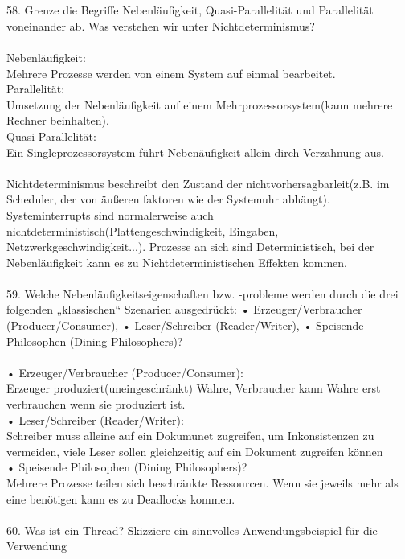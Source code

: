 \documentclass{article}
\newcommand\tab[1][1cm]{\hspace*{#1}}
\begin{document}
\\
\\
58. Grenze die Begriffe Nebenläufigkeit, Quasi-Parallelität und Parallelität voneinander ab.
Was verstehen wir unter Nichtdeterminismus?
\\
\\
Nebenl\"aufigkeit:\\
\tab Mehrere Prozesse werden von einem System auf einmal bearbeitet.\\
Parallelit\"at:\\
\tab Umsetzung der Nebenl\"aufigkeit auf einem Mehrprozessorsystem(kann mehrere Rechner beinhalten).\\
Quasi-Parallelit\"at:\\
\tab Ein Singleprozessorsystem f\"uhrt Neben\"aufigkeit allein dirch Verzahnung aus.\\
\\
Nichtdeterminismus beschreibt den Zustand der nichtvorhersagbarleit(z.B. im Scheduler, der von \"au\ss eren faktoren wie der Systemuhr abh\"angt).\\
Systeminterrupts sind normalerweise auch nichtdeterministisch(Plattengeschwindigkeit, Eingaben, Netzwerkgeschwindigkeit...).
Prozesse an sich sind Deterministisch, bei der Nebenl\"aufigkeit kann es zu Nichtdeterministischen Effekten kommen.
\\
\\
59. Welche Nebenläufigkeitseigenschaften bzw. -probleme werden durch die drei folgenden
„klassischen“ Szenarien ausgedrückt:
• Erzeuger/Verbraucher (Producer/Consumer),
• Leser/Schreiber (Reader/Writer),
• Speisende Philosophen (Dining Philosophers)?
\\
\\
• Erzeuger/Verbraucher (Producer/Consumer):\\
\tab Erzeuger produziert(uneingeschr\"ankt) Wahre, Verbraucher kann Wahre erst verbrauchen wenn sie produziert ist.\\
• Leser/Schreiber (Reader/Writer):\\
\tab Schreiber muss alleine auf ein Dokumunet zugreifen, um Inkonsistenzen zu vermeiden, viele Leser sollen gleichzeitig auf ein Dokument zugreifen k\"onnen\\
• Speisende Philosophen (Dining Philosophers)?\\
Mehrere Prozesse teilen sich beschr\"ankte Ressourcen. Wenn sie jeweils mehr als eine ben\"otigen kann es zu Deadlocks kommen.
\\
\\
60. Was ist ein Thread? Skizziere ein sinnvolles Anwendungsbeispiel für die Verwendung
\end{document}

